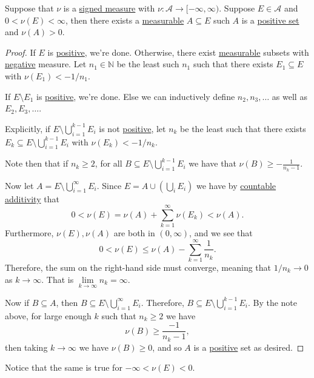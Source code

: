 \begin{lemma}\label{lma:lec28-2}
	Suppose that \(\nu\) is a \hyperref[def:signed-measure]{signed measure} with \(\nu \colon \mathcal{A} \to [-\infty, \infty)\).
	Suppose \(E \in \mathcal{A}\) and \(0 < \nu(E) < \infty\), then there exists a \hyperref[def:measurable-set]{measurable} \(A \subseteq E\)
	such \(A\) is a \hyperref[def:positive-set-for-a-signed-measure]{positive set} and \(\nu(A) > 0\).
\end{lemma}
\begin{proof}
	If \(E\) is \hyperref[def:positive-set-for-a-signed-measure]{positive}, we're done. Otherwise, there exist \hyperref[def:measurable-set]{measurable} subsets with
	\hyperref[def:negative-set-for-a-signed-measure]{negative} measure. Let \(n_1 \in \mathbb{N}\) be the least such \(n_1\) such that there exists
	\(E_1 \subseteq E\) with \(\nu(E_1) < -1/n_1\).

	If \(E \setminus E_1\) is \hyperref[def:positive-set-for-a-signed-measure]{positive}, we're done. Else we can inductively define \(n_2,n_3,\dots\) as well as \(E_2,E_3,\dots\).

	Explicitly, if \(E \setminus \bigcup_{i=1}^{k-1} E_i\) is not \hyperref[def:positive-set-for-a-signed-measure]{positive}, let \(n_k\) be the least such that there
	exists \(E_k \subseteq E \setminus \bigcup_{i=1}^{k-1} E_i\) with \(\nu(E_k) < -1/n_k\).

	Note then that if \(n_k \geq 2\), for all \(B \subseteq E \setminus \bigcup_{i=1}^{k-1}E_i\) we have that \(\nu(B) \geq -\frac{1}{n_k - 1}\).

	Now let \(A = E \setminus \bigcup_{i=1}^\infty E_i\). Since \(E = A \cup \left(\bigcup_i E_i\right)\) we have by \hyperref[def:measure-countable-additivity]{countable additivity} that
	\[
		0 < \nu(E) = \nu(A) + \sum_{k=1}^\infty \nu(E_k) < \nu(A).
	\]
	Furthermore, \(\nu(E),\nu(A)\) are both in \((0,\infty)\), and we see that
	\[
		0 < \nu(E) \leq \nu(A) - \sum_{k=1}^\infty \frac{1}{n_k}.
	\]
	Therefore, the sum on the right-hand side must converge, meaning that \(1/n_k \to 0\) as \(k \to \infty\). That is \(\lim\limits_{k \to \infty} n_k = \infty\).

	Now if \(B \subseteq A\), then \(B \subseteq E \setminus \bigcup_{i=1}^\infty E_i\). Therefore, \(B \subseteq  E \setminus \bigcup_{i=1}^{k-1} E_i\). By the note above,
	for large enough \(k\) such that \(n_k \geq 2\) we have
	\[
		\nu(B) \geq \frac{-1}{n_k - 1},
	\]
	then taking \(k \to \infty\) we have \(\nu(B) \geq 0\), and so \(A\) is a \hyperref[def:positive-set-for-a-signed-measure]{positive} set as desired.
\end{proof}
\begin{remark}
	Notice that the same is true for \(-\infty < \nu (E) < 0\).
\end{remark}

